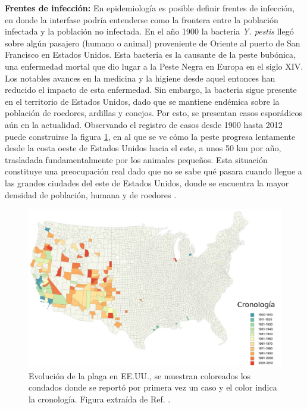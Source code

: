 \textbf{Frentes de infección:} En epidemiología es posible definir frentes de infección, en donde la interfase podría entenderse como la frontera 
entre la población infectada y la población no infectada. En el año 1900 la bacteria \textit{Y. pestis} llegó sobre algún pasajero (humano o animal) proveniente de Oriente
al puerto de San Francisco en Estados Unidos. Esta bacteria es la causante de la peste bubónica, una enfermedad mortal que dio lugar a la Peste Negra en Europa 
en el siglo XIV. Los notables avances en la medicina y la higiene desde aquel entonces han reducido el impacto de esta enfermedad. Sin embargo, la bacteria 
sigue presente en el territorio de Estados Unidos, dado que se mantiene endémica sobre la población de roedores, ardillas y conejos. Por esto, se presentan casos 
esporádicos aún en la actualidad. Observando el registro de casos desde 1900 hasta 2012 puede construirse la figura \ref{fig:infeccion}, en al que se ve cómo la peste 
progresa lentamente desde la costa oeste de Estados Unidos hacia el este, a unos 50 km por año, trasladada fundamentalmente por los animales pequeños. Esta 
situación constituye una preocupación real dado que no se sabe qué pasara cuando llegue a las grandes ciudades del este de Estados Unidos, donde se encuentra 
la mayor densidad de población, humana y de roedores \cite{mate_sist_bio,barbieri2020soil,stenseth2008plague}.
\newpage

\begin{figure}[ht]
    \centering
    \includegraphics[width=\imsizeL]{peste_eeuu.png}
    \caption[Evolución de la plaga en EE.UU.]{Evolución de la plaga en EE.UU., se muestran coloreados los condados donde se reportó por primera vez un caso y el color indica la cronología. Figura extraída de Ref. \cite{barbieri2020soil}.}
    \label{fig:infeccion}
\end{figure}

